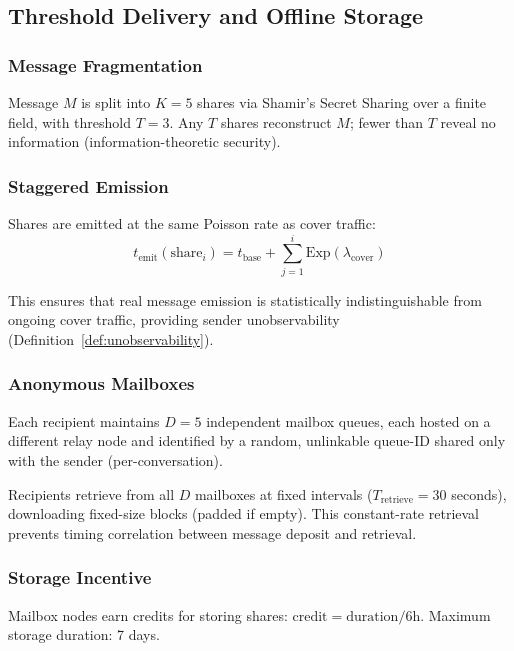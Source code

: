 \documentclass[11pt,a4paper]{article}
\begin{document}
\subsection{Threshold Delivery and Offline Storage}
\label{sec:delivery}

\subsubsection{Message Fragmentation}

Message $M$ is split into $K = 5$ shares via Shamir's Secret Sharing over a finite field, with threshold $T = 3$. Any $T$ shares reconstruct $M$; fewer than $T$ reveal no information (information-theoretic security).

\subsubsection{Staggered Emission}

Shares are emitted at the same Poisson rate as cover traffic:
\begin{equation}
    t_{\text{emit}}(\text{share}_i) = t_{\text{base}} + \sum_{j=1}^{i} \text{Exp}(\lambda_{\text{cover}})
\end{equation}

This ensures that real message emission is statistically indistinguishable from ongoing cover traffic, providing sender unobservability (Definition~\ref{def:unobservability}).

\subsubsection{Anonymous Mailboxes}

Each recipient maintains $D = 5$ independent mailbox queues, each hosted on a different relay node and identified by a random, unlinkable queue-ID shared only with the sender (per-conversation).

Recipients retrieve from all $D$ mailboxes at fixed intervals ($T_{\text{retrieve}} = 30$ seconds), downloading fixed-size blocks (padded if empty). This constant-rate retrieval prevents timing correlation between message deposit and retrieval.

\subsubsection{Storage Incentive}

Mailbox nodes earn credits for storing shares: $\text{credit} = \text{duration} / 6\text{h}$. Maximum storage duration: 7 days.
\end{document}
